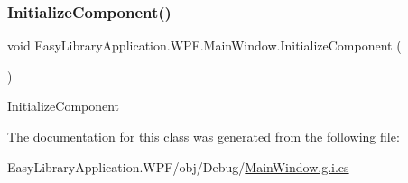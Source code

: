 \subsubsection{\texorpdfstring{Initialize\+Component()}{InitializeComponent()}}
{\footnotesize\ttfamily void Easy\+Library\+Application.\+W\+P\+F.\+Main\+Window.\+Initialize\+Component (\begin{DoxyParamCaption}{ }\end{DoxyParamCaption})}



Initialize\+Component 



The documentation for this class was generated from the following file\+:\begin{DoxyCompactItemize}
\item 
Easy\+Library\+Application.\+W\+P\+F/obj/\+Debug/\mbox{\hyperlink{_main_window_8g_8i_8cs}{Main\+Window.\+g.\+i.\+cs}}\end{DoxyCompactItemize}
